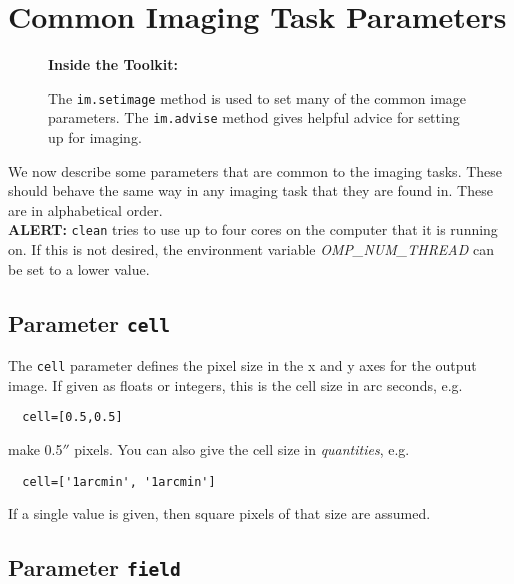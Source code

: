 \section{Common Imaging Task Parameters}
\label{section:im.pars}

\begin{wrapfigure}{r}{2.5in}
  \begin{boxedminipage}{2.5in}
     \centerline{\bf Inside the Toolkit:}
     The {\tt im.setimage} method is used to set many of the
     common image parameters.  The {\tt im.advise} method
     gives helpful advice for setting up for imaging.
  \end{boxedminipage}
\end{wrapfigure}

We now describe some parameters that are common to the imaging
tasks.  These should behave the same way in any imaging task
that they are found in.  These are in alphabetical order.\\[1cm]


{\bf ALERT:} {\tt clean} tries to use up to four cores on the computer that
it is running on. If this is not desired, the environment variable
{\it OMP\_NUM\_THREAD} can be set to a lower value. 


\subsection{Parameter {\tt cell} }
\label{section:im.pars.cell}

The {\tt cell} parameter defines the pixel size in the
x and y axes for the output
image.  If given as floats or integers, this is the cell size
in arc seconds, e.g.
\small
\begin{verbatim}
  cell=[0.5,0.5]
\end{verbatim}
\normalsize
make 0.5$''$ pixels.
You can also give the cell size in {\it quantities}, e.g.
\small
\begin{verbatim}
  cell=['1arcmin', '1arcmin']
\end{verbatim}
\normalsize
If a single value is given, then square pixels of that size
are assumed.

\subsection{Parameter {\tt field} }
\label{section:im.pars.field}

